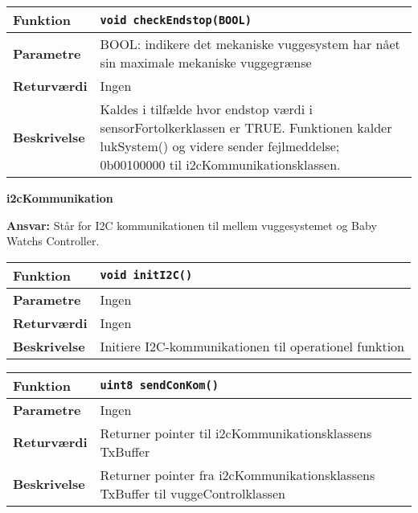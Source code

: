 \begin{center}
    \begin{tabular}{ | l | p{} |}
    \hline
    \textbf{Funktion}	& \verb+void checkEndstop(BOOL) +						\\ \hline
    \textbf{Parametre} 	& BOOL: indikere det mekaniske vuggesystem har nået sin maximale mekaniske vuggegrænse		\\ \hline
    \textbf{Returværdi}	& Ingen 								\\ \hline
    \textbf{Beskrivelse}	& Kaldes i tilfælde hvor endstop værdi i sensorFortolkerklassen er TRUE. Funktionen kalder lukSystem() og videre sender fejlmeddelse; 0b00100000 til i2cKommunikationsklassen.		\\ \hline
    \end{tabular}
\end{center}


{\centering
\textbf{i2cKommunikation}\par
}
\textbf{Ansvar:} Står for I2C kommunikationen til mellem vuggesystemet og Baby Watchs Controller. \

\begin{center}
    \begin{tabular}{ | l | p{} |}
    \hline
    \textbf{Funktion}	& \verb+void initI2C() +									\\ \hline
    \textbf{Parametre} 	& Ingen														\\ \hline
    \textbf{Returværdi}	& Ingen 													\\ \hline
    \textbf{Beskrivelse}	& Initiere I2C-kommunikationen til operationel funktion	\\ \hline
    \end{tabular}
\end{center}

\begin{center}
    \begin{tabular}{ | l | p{} |}
    \hline
    \textbf{Funktion}	& \verb+uint8 sendConKom() +								\\ \hline
    \textbf{Parametre} 	& Ingen														\\ \hline
    \textbf{Returværdi}	& Returner pointer til i2cKommunikationsklassens TxBuffer											\\ \hline
    \textbf{Beskrivelse}	& Returner pointer fra i2cKommunikationsklassens TxBuffer til vuggeControlklassen	\\ \hline
    \end{tabular}
\end{center}

